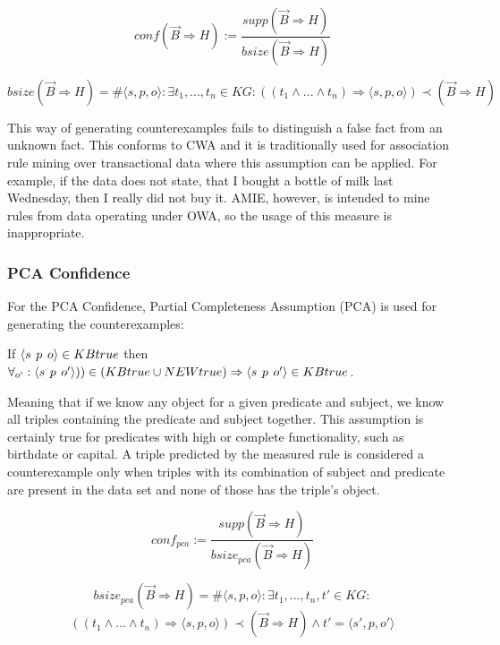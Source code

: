 $$ conf(\vec{B} \Rightarrow H) := \frac{supp(\vec{B} \Rightarrow H)}{bsize(\vec{B} \Rightarrow H)} $$

$$
bsize(\vec{B} \Rightarrow H) = \# \langle s,p,o \rangle : \exists t_{1},...,t_{n} \in KG : ((t_{1}\land ...\land t_{n}) \Rightarrow \langle s,p,o \rangle) \prec (\vec{B} \Rightarrow H)
$$


This way of generating counterexamples fails to distinguish a false fact from an unknown fact. This conforms to CWA and it is traditionally used for association rule mining over transactional data where this assumption can be applied. For example, if the data does not state, that I bought a bottle of milk last Wednesday, then I really did not buy it. AMIE, however, is intended to mine rules from data operating under OWA, so the usage of this measure is inappropriate.

\subsubsection{PCA Confidence}

For the PCA Confidence, Partial Completeness Assumption (PCA) is used for generating the counterexamples:

If $\langle s\hspace{0.4em}p\hspace{0.4em}o\rangle\in KBtrue$ then $\forall_{o'}: \langle s\hspace{0.4em}p\hspace{0.4em}o'\rangle))\in(KBtrue \cup NEWtrue) \Rightarrow \langle s\hspace{0.4em}p\hspace{0.4em}o'\rangle\in KBtrue$.

Meaning that if we know any object for a given predicate and subject, we know all triples containing the predicate and subject together. This assumption is certainly true for predicates with high or complete functionality, such as birthdate or capital. A triple predicted by the measured rule is considered a counterexample only when triples with its combination of subject and predicate are present in the data set and none of those has the triple's object. 

$$conf_{pca} := \frac{supp(\vec{B} \Rightarrow H)}{bsize_{pca}(\vec{B} \Rightarrow H)}$$

$$
bsize_{pca}(\vec{B} \Rightarrow H) = \# \langle s,p,o \rangle : \exists t_{1},...,t_{n},t' \in KG :
$$
$$
((t_{1}\land ...\land t_{n}) \Rightarrow \langle s,p,o \rangle) \prec (\vec{B} \Rightarrow H) \land t' = \langle s',p,o' \rangle
$$

